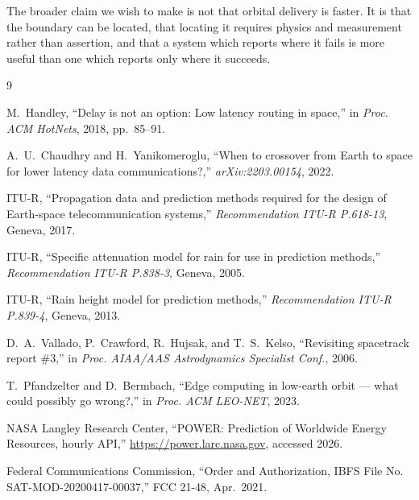 \documentclass[10pt,twocolumn]{article}
\begin{document}
The broader claim we wish to make is not that orbital delivery is faster. It is
that the boundary can be located, that locating it requires physics and
measurement rather than assertion, and that a system which reports where it
fails is more useful than one which reports only where it succeeds.

\begin{thebibliography}{9}
\small

M.~Handley,
``Delay is not an option: Low latency routing in space,''
in \emph{Proc. ACM HotNets}, 2018, pp.~85--91.

A.~U.~Chaudhry and H.~Yanikomeroglu,
``When to crossover from Earth to space for lower latency data communications?,''
\emph{arXiv:2203.00154}, 2022.

ITU-R,
``Propagation data and prediction methods required for the design of
Earth-space telecommunication systems,''
\emph{Recommendation ITU-R P.618-13}, Geneva, 2017.

ITU-R,
``Specific attenuation model for rain for use in prediction methods,''
\emph{Recommendation ITU-R P.838-3}, Geneva, 2005.

ITU-R,
``Rain height model for prediction methods,''
\emph{Recommendation ITU-R P.839-4}, Geneva, 2013.

D.~A.~Vallado, P.~Crawford, R.~Hujsak, and T.~S.~Kelso,
``Revisiting spacetrack report \#3,''
in \emph{Proc. AIAA/AAS Astrodynamics Specialist Conf.}, 2006.

T.~Pfandzelter and D.~Bermbach,
``Edge computing in low-earth orbit --- what could possibly go wrong?,''
in \emph{Proc. ACM LEO-NET}, 2023.

NASA Langley Research Center,
``POWER: Prediction of Worldwide Energy Resources, hourly API,''
\url{https://power.larc.nasa.gov}, accessed 2026.

Federal Communications Commission,
``Order and Authorization, IBFS File No. SAT-MOD-20200417-00037,''
FCC 21-48, Apr.~2021.

\end{thebibliography}
\end{document}
